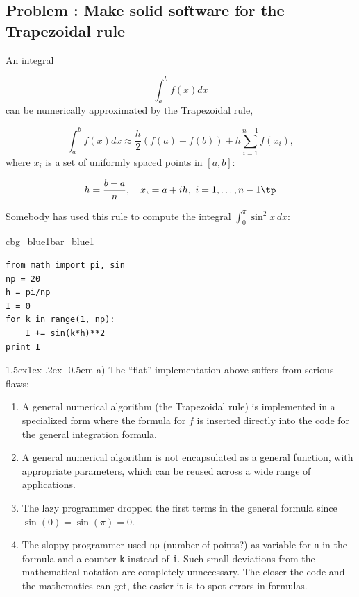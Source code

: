 \documentclass[%
oneside,                 %
final,                   %
10pt]{article}
\makeatletter
\newenvironment{_pro_tight}[2]{
   \def\FrameCommand{\color{#2}\vrule width 1mm\normalcolor\colorbox{#1}}
   \FrameRule0.6pt\MakeFramed {\advance\hsize-2mm\FrameRestore}\vskip3mm}
   {\vskip0mm\endMakeFramed}
\newenvironment{pro}[2]{
\bgroup\rmfamily
\fboxsep=0mm\relax
\begin{_pro_tight}{#1}{#2}
\list{}{\parsep=-2mm\parskip=0mm\topsep=0pt\leftmargin=2mm
\rightmargin=2\leftmargin\leftmargin=4pt\relax}
\item\relax}
{\endlist\end{_pro_tight}\egroup}
\newenvironment{doconceexercise}{}{}
\newcounter{doconceexercisecounter}
\newcommand\subex{\@startsection{paragraph}{4}{\z@}%
                  {1.5ex\@plus1ex \@minus.2ex}%
                  {-0.5em}%
                  {\normalfont\normalsize\bfseries}}
\makeatother
\begin{document}




\begin{doconceexercise}

\subsection*{Problem \thedoconceexercisecounter: Make solid software for the Trapezoidal rule}

\label{softeng1:exer:integral:flat}

An integral

\[ \int_a^b f(x)dx \]
can be numerically approximated by the Trapezoidal rule,

\[ \int_a^b f(x)dx \approx \frac{h}{2}(f(a) + f(b)) + h\sum_{i=1}^{n-1} f(x_i),
\]
where $x_i$ is a set of uniformly spaced points in $[a,b]$:

\[ h = \frac{b-a}{n},\quad x_i=a + ih,\ i=1,\ldots,n-1\tp \]

Somebody has used this rule to compute the integral $\int_0^\pi \sin^2x\, dx$:

\begin{pro}{cbg_blue1}{bar_blue1}\begin{Verbatim}[numbers=none,fontsize=\fontsize{9pt}{9pt},baselinestretch=0.95,xleftmargin=2mm]
from math import pi, sin
np = 20
h = pi/np
I = 0
for k in range(1, np):
    I += sin(k*h)**2
print I
\end{Verbatim}
\end{pro}
\noindent


\subex{a)}
The ``flat'' implementation above suffers from serious flaws:

\begin{enumerate}
\item A general numerical algorithm (the Trapezoidal rule) is implemented
   in a specialized form where the formula for $f$ is inserted directly
   into the code for the general integration formula.

\item A general numerical algorithm is not encapsulated as a general
   function, with appropriate parameters, which can be reused
   across a wide range of applications.

\item The lazy programmer dropped the first terms in the general formula
   since $\sin(0)=\sin(\pi)=0$.

\item The sloppy programmer used \texttt{np} (number of points?) as variable for
   \texttt{n} in the formula and a counter \texttt{k} instead of \texttt{i}. Such small
   deviations from the mathematical notation are completely unnecessary.
   The closer the code and the mathematics can get, the easier it is
   to spot errors in formulas.
\end{enumerate}


\end{doconceexercise}
\end{document}
